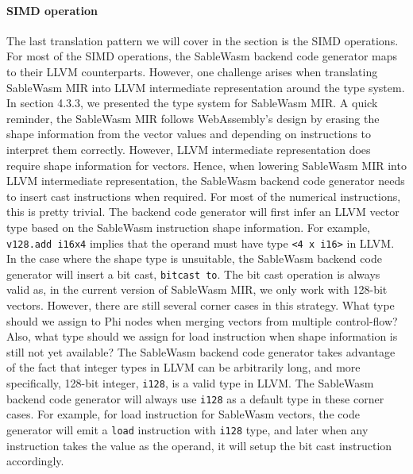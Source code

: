 \paragraph{SIMD operation}
The last translation pattern we will cover in the section is the SIMD operations. For most of the SIMD operations, the SableWasm backend code generator maps to their LLVM counterparts. However, one challenge arises when translating SableWasm MIR into LLVM intermediate representation around the type system. In section 4.3.3, we presented the type system for SableWasm MIR. A quick reminder, the SableWasm MIR follows WebAssembly's design by erasing the shape information from the vector values and depending on instructions to interpret them correctly. However, LLVM intermediate representation does require shape information for vectors. Hence, when lowering SableWasm MIR into LLVM intermediate representation, the SableWasm backend code generator needs to insert cast instructions when required. For most of the numerical instructions, this is pretty trivial. The backend code generator will first infer an LLVM vector type based on the SableWasm instruction shape information. For example, \texttt{v128.add i16x4} implies that the operand must have type \texttt{<4 x i16>} in LLVM. In the case where the shape type is unsuitable, the SableWasm backend code generator will insert a bit cast, \texttt{bitcast to}. The bit cast operation is always valid as, in the current version of SableWasm MIR, we only work with 128-bit vectors. However, there are still several corner cases in this strategy. What type should we assign to Phi nodes when merging vectors from multiple control-flow? Also, what type should we assign for load instruction when shape information is still not yet available? The SableWasm backend code generator takes advantage of the fact that integer types in LLVM can be arbitrarily long, and more specifically, 128-bit integer, \texttt{i128}, is a valid type in LLVM. The SableWasm backend code generator will always use \texttt{i128} as a default type in these corner cases. For example, for load instruction for SableWasm vectors, the code generator will emit a \texttt{load} instruction with \texttt{i128} type, and later when any instruction takes the value as the operand, it will setup the bit cast instruction accordingly.